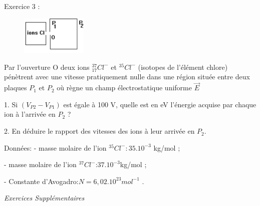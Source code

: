 \documentclass[12pt, french]{article}
\begin{document}
\begin{Box2}{Exercice 3 :}
\begin{figure}
  \begin{center}
    \includegraphics[width=0.28\textwidth]{./img/img_01.png}
  \end{center}
\end{figure}


   Par l’ouverture O deux ions $^{37}_{17}Cl^-$ et $^35Cl^-$
(isotopes de l’élément chlore) pénètrent avec une vitesse pratiquement nulle dans une région située entre deux plaques $P_1$ et $P_2$ où règne un champ électrostatique uniforme $\vec{E}$

   1. Si $(V_{P2} - V_{P1})$ est égale à 100 V, quelle est en eV l’énergie acquise par chaque
ion à l’arrivée en $P_2$ ?

   2. En déduire le rapport des vitesses des ions à leur arrivée en $P_2$.

   Données: - masse molaire de l’ion $^{35}Cl^- : 35.10^{-3}$ kg/mol ;

   - masse molaire de l’ion $^{37}Cl^-$:$37.10^{-3}$kg/mol ;

   - Constante d’Avogadro:$N = 6,02.10^{23} mol^{-1}$ .
\end{Box2}
\vspace{3cm}
\begin{center}
   \Large{ \em{Exercices Supplémentaires}}
\end{center}
\end{document}
